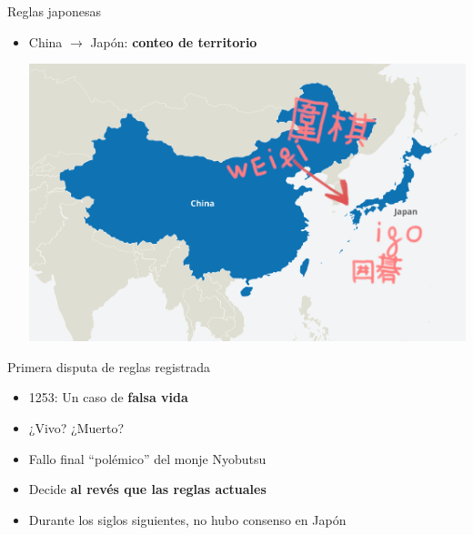 \documentclass{beamer}
\begin{document}
\begin{frame}{Reglas japonesas}
  
  \begin{itemize}
    \item China $\rightarrow$ Japón: \textbf{conteo de territorio}
    
    \includegraphics[scale=0.2]{chinajapon.png}
  \end{itemize}
  
\end{frame}


\begin{frame}{Primera disputa de reglas registrada}
  
  \begin{itemize}
    \item 1253: Un caso de \textbf{falsa vida}
    \item ¿Vivo? ¿Muerto?
    \item Fallo final ``polémico'' del monje Nyobutsu
    \item Decide \textbf{al revés que las reglas actuales}
    \item Durante los siglos siguientes, no hubo consenso en Japón
    
  \end{itemize}
  
\end{frame}
\end{document}
